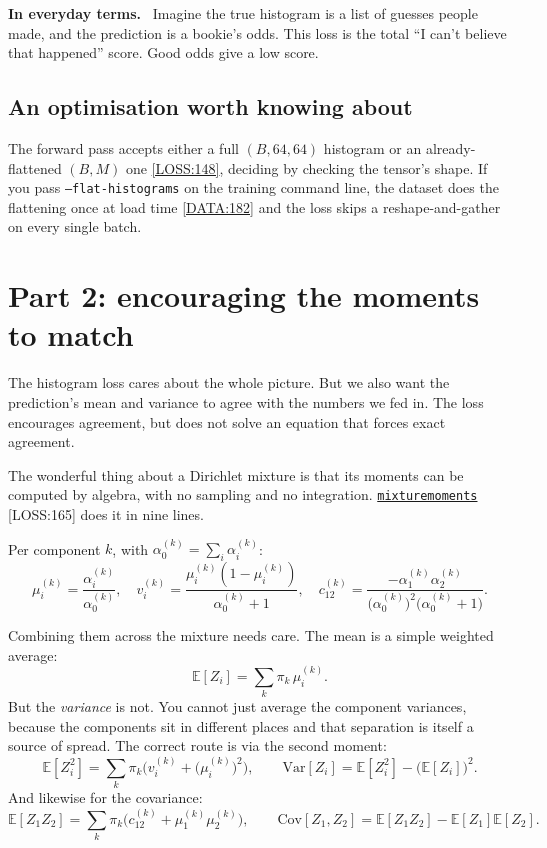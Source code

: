 \documentclass[11pt,a4paper]{report}
\newcommand{\srcbase}{vscode://file/Users/syellapa/Documents/Research/2026/ANSYS/Multi-ScalarPDF}
\newcommand{\dmdn}{dirichlet\string_mdn}
\newcommand{\srctag}[1]{{\footnotesize\textcolor{TagGray}{[#1]}}}
\newcommand{\Loss}[2]{\href{\srcbase/\dmdn/losses.py:#1}{\texttt{#2}}\,\srctag{LOSS:#1}}
\newcommand{\LossL}[1]{\href{\srcbase/\dmdn/losses.py:#1}{\srctag{LOSS:#1}}}
\newcommand{\DataL}[1]{\href{\srcbase/\dmdn/data.py:#1}{\srctag{DATA:#1}}}
\newcommand{\code}[1]{\texttt{#1}}
\renewcommand{\_}{\origtextunderscore\allowbreak}
\newlength{\calloutwidth}
\newcommand{\calloutOpen}{%
  \par\medskip\noindent
  \setlength{\calloutwidth}{\dimexpr\linewidth-2\fboxsep\relax}%
  \begin{lrbox}{\calloutbox}\begin{minipage}{\calloutwidth}}
\newcommand{\calloutClose}[1]{%
  \end{minipage}\end{lrbox}\colorbox{#1}{\usebox{\calloutbox}}\par\medskip}
\newenvironment{analogy}
  {\calloutOpen\textbf{In everyday terms.}\ }
  {\calloutClose{BoxBG}}
\begin{document}
\begin{analogy}
Imagine the true histogram is a list of guesses people made, and the prediction is a bookie's
odds. This loss is the total ``I can't believe that happened'' score. Good odds give a low
score.
\end{analogy}

\subsection*{An optimisation worth knowing about}

The forward pass accepts either a full $(B, 64, 64)$ histogram or an already-flattened
$(B, M)$ one \LossL{148}, deciding by checking the tensor's shape. If you pass
\code{--flat-histograms} on the training command line, the dataset does the flattening once
at load time \DataL{182} and the loss skips a reshape-and-gather on every single batch.

\section{Part 2: encouraging the moments to match}

The histogram loss cares about the whole picture. But we also want the prediction's mean and
variance to agree with the numbers we fed in. The loss encourages agreement, but does not solve
an equation that forces exact agreement.

The wonderful thing about a Dirichlet mixture is that its moments can be computed by algebra,
with no sampling and no integration. \Loss{165}{mixture\_moments} does it in nine lines.

Per component $k$, with $\alpha_0^{(k)} = \sum_i \alpha^{(k)}_i$:
\[
  \mu^{(k)}_i = \frac{\alpha^{(k)}_i}{\alpha_0^{(k)}}, \quad
  v^{(k)}_i = \frac{\mu^{(k)}_i (1 - \mu^{(k)}_i)}{\alpha_0^{(k)} + 1}, \quad
  c^{(k)}_{12} = \frac{-\alpha^{(k)}_1\alpha^{(k)}_2}{\big(\alpha_0^{(k)}\big)^2\big(\alpha_0^{(k)} + 1\big)} .
\]

Combining them across the mixture needs care. The mean is a simple weighted average:
\[
  \mathbb{E}[Z_i] = \sum_k \pi_k\, \mu^{(k)}_i .
\]
But the \emph{variance} is not. You cannot just average the component variances, because the
components sit in different places and that separation is itself a source of spread. The
correct route is via the second moment:
\[
  \mathbb{E}[Z_i^2] = \sum_k \pi_k\Big(v^{(k)}_i + \big(\mu^{(k)}_i\big)^2\Big),
  \qquad
  \mathrm{Var}[Z_i] = \mathbb{E}[Z_i^2] - \big(\mathbb{E}[Z_i]\big)^2 .
\]
And likewise for the covariance:
\[
  \mathbb{E}[Z_1 Z_2] = \sum_k \pi_k\Big(c^{(k)}_{12} + \mu^{(k)}_1\mu^{(k)}_2\Big),
  \qquad
  \mathrm{Cov}[Z_1, Z_2] = \mathbb{E}[Z_1 Z_2] - \mathbb{E}[Z_1]\mathbb{E}[Z_2] .
\]
\end{document}
